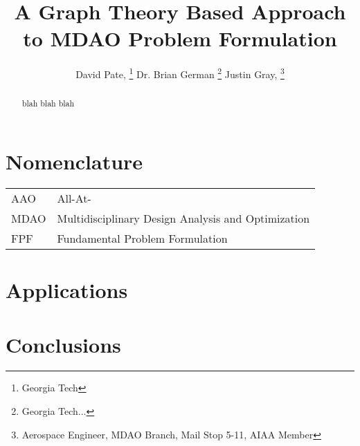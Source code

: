 \documentclass[]{aiaa-tc} %
\title{A Graph Theory Based Approach to MDAO Problem Formulation}
\author{
  David Pate, %
     \thanks{Georgia Tech}
  Dr. Brian German 
     \thanks{Georgia Tech...}
  Justin Gray,%
     \thanks{Aerospace Engineer, MDAO Branch, Mail Stop 5-11, AIAA Member}   
 }
\begin{document}
\maketitle
 
\begin{abstract}
   blah blah blah
\end{abstract}

\section*{Nomenclature}

\begin{tabular}{l l} 
    AAO      & All-At- \\
    MDAO     & Multidisciplinary Design Analysis and Optimization \\
    FPF      & Fundamental Problem Formulation \\
\end{tabular}








\section{Applications}

\section{Conclusions}


\end{document}
